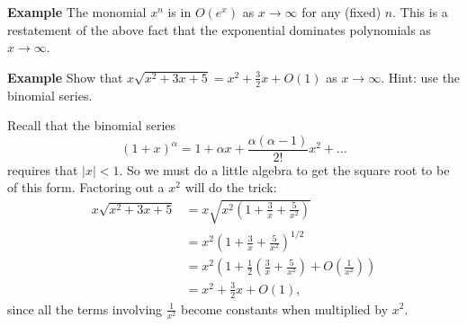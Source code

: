 \documentclass[twoside,openright,titlepage,a4paper]{book}
\begin{document}
\begin{sloppypar}
\textbf{Example} The monomial $x^n$ is in $O(e^x)$ as $x \rightarrow \infty$ for any (fixed) $n$. This is a restatement of the above fact that the exponential dominates polynomials as $x \rightarrow \infty$.

\textbf{Example} Show that $x \sqrt{x^2 + 3x + 5} = x^2 + \frac{3}{2}x + O(1)$ as $x \rightarrow \infty$. Hint: use the binomial series.
\begin{examplebox}
Recall that the binomial series \[ (1+x)^\alpha = 1 + \alpha x + \frac{\alpha (\alpha - 1)}{2!} x^2 + \ldots \] requires that $|x|<1$. So we must do a little algebra to get the square root to be of this form. Factoring out a $x^2$ will do the trick:
\begin{align*} 
x \sqrt{x^2+3x+5} &= x \sqrt{x^2 \left( 1 + \frac{3}{x} + \frac{5}{x^2} \right)} \\
&= x^2 \left(1 + \frac{3}{x} + \frac{5}{x^2} \right)^{1/2} \\
&= x^2 \left( 1 + \frac{1}{2}\left(\frac{3}{x} + \frac{5}{x^2}\right) + O\left(\frac{1}{x^2}\right) \right) \\
&= x^2 + \frac{3}{2}x + O(1), 
\end{align*}
since all the terms involving $\frac{1}{x^2}$ become constants when multiplied by $x^2$.
\end{examplebox}


\end{sloppypar}
\end{document}

